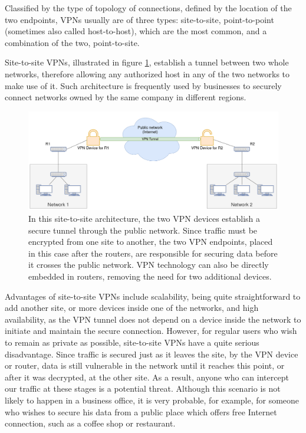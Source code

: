 \documentclass[a4paper,12pt]{report}
\begin{document}
		Classified by the type of topology of connections, defined by the location of the two endpoints, VPNs usually are of three types: site-to-site, point-to-point (sometimes also called host-to-host), which are the most common, and a combination of the two, point-to-site.
		
		Site-to-site VPNs, illustrated in figure \ref{fig:site-to-site_VPN}, establish a tunnel between two whole networks, therefore allowing any authorized host in any of the two networks to make use of it. Such architecture is frequently used by businesses to securely connect networks owned by the same company in different regions.
		\begin{figure}[h]
			\includegraphics[width=\textwidth]{site-to-site_VPN}
			\centering
			\caption{In this site-to-site architecture, the two VPN devices establish a secure tunnel through the public network. Since traffic must be encrypted from one site to another, the two VPN endpoints, placed in this case after the routers, are responsible for securing data before it crosses the public network. VPN technology can also be directly embedded in routers, removing the need for two additional devices.}
			\label{fig:site-to-site_VPN}
		\end{figure}
		
		Advantages of site-to-site VPNs include scalability, being quite straightforward to add another site, or more devices inside one of the networks, and high availability, as the VPN tunnel does not depend on a device inside the network to initiate and maintain the secure connection. However, for regular users who wish to remain as private as possible, site-to-site VPNs have a quite serious disadvantage. Since traffic is secured just as it leaves the site, by the VPN device or router, data is still vulnerable in the network until it reaches this point, or after it was decrypted, at the other site. As a result, anyone who can intercept our traffic at these stages is a potential threat. Although this scenario is not likely to happen in a business office, it is very probable, for example, for someone who wishes to secure his data from a public place which offers free Internet connection, such as a coffee shop or restaurant.
		
\end{document}

